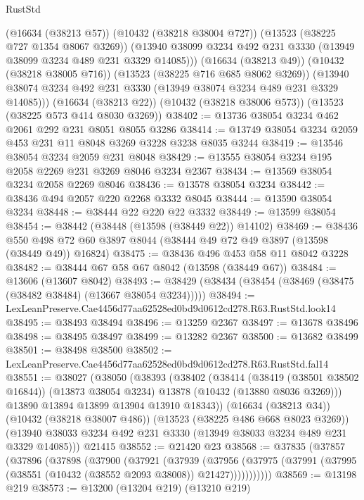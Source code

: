 \begin{lexlean}{RustStd}
\begin{coremodule}
        (@16634 (@38213 @57))
        (@10432 (@38218 @38004 @727))
        (@13523 (@38225 @727 @1354 @8067 @3269))
        (@13940 @38099 @3234 @492 @231 @3330 (@13949 @38099 @3234 @489 @231 @3329 @14085)))
      (@16634 (@38213 @49))
      (@10432 (@38218 @38005 @716))
      (@13523 (@38225 @716 @685 @8062 @3269))
      (@13940 @38074 @3234 @492 @231 @3330 (@13949 @38074 @3234 @489 @231 @3329 @14085)))
    (@16634 (@38213 @22))
    (@10432 (@38218 @38006 @573))
    (@13523 (@38225 @573 @414 @8030 @3269))
@38402 := @13736 @38054 @3234 @462 @2061 @292 @231 @8051 @8055 @3286
@38414 := @13749 @38054 @3234 @2059 @453 @231 @11 @8048 @3269 @3228 @3238 @8035 @3244
@38419 := @13546 @38054 @3234 @2059 @231 @8048
@38429 := @13555 @38054 @3234 @195 @2058 @2269 @231 @3269 @8046 @3234 @2367
@38434 := @13569 @38054 @3234 @2058 @2269 @8046
@38436 := @13578 @38054 @3234
@38442 := @38436 @494 @2057 @220 @2268 @3332 @8045
@38444 := @13590 @38054 @3234
@38448 := @38444 @22 @220 @22 @3332
@38449 := @13599 @38054
@38454 := @38442 (@38448 (@13598 (@38449 @22)) @14102)
@38469 := @38436
    @550
    @498
    @72
    @60
    @3897
    @8044
    (@38444 @49 @72 @49 @3897 (@13598 (@38449 @49)) @16824)
@38475 := @38436 @496 @453 @58 @11 @8042 @3228
@38482 := @38444 @67 @58 @67 @8042 (@13598 (@38449 @67))
@38484 := @13606 (@13607 @8042)
@38493 := @38429 (@38434 (@38454 (@38469 (@38475 (@38482 @38484) (@13667 @38054 @3234)))))
@38494 := LexLeanPreserve.Cae4456d77aa62528ed0bd9d0612cd278.R63.RustStd.look14
@38495 := @38493 @38494
@38496 := @13259 @2367
@38497 := @13678 @38496
@38498 := @38495 @38497
@38499 := @13282 @2367
@38500 := @13682 @38499
@38501 := @38498 @38500
@38502 := LexLeanPreserve.Cae4456d77aa62528ed0bd9d0612cd278.R63.RustStd.fal14
@38551 := @38027
    (@38050
      (@38393
        (@38402
          (@38414
            (@38419 (@38501 @38502 @16844))
            (@13873 @38054 @3234)
            @13878
            (@10432 (@13880 @8036 @3269)))
          @13890
          @13894
          @13899
          @13904
          @13910
          @18343))
      (@16634 (@38213 @34))
      (@10432 (@38218 @38007 @486))
      (@13523 (@38225 @486 @668 @8023 @3269))
      (@13940 @38033 @3234 @492 @231 @3330 (@13949 @38033 @3234 @489 @231 @3329 @14085)))
    @21415
@38552 := @21420 @23
@38568 := @37835
    (@37857
      (@37896
        (@37898
          (@37900
            (@37921
              (@37939
                (@37956
                  (@37975 (@37991 (@37995 (@38551 (@10432 (@38552 @2093 @38008)) @21427)))))))))))
@38569 := @13198 @219
@38573 := @13200 (@13204 @219) (@13210 @219)

\end{coremodule}
\end{lexlean}
